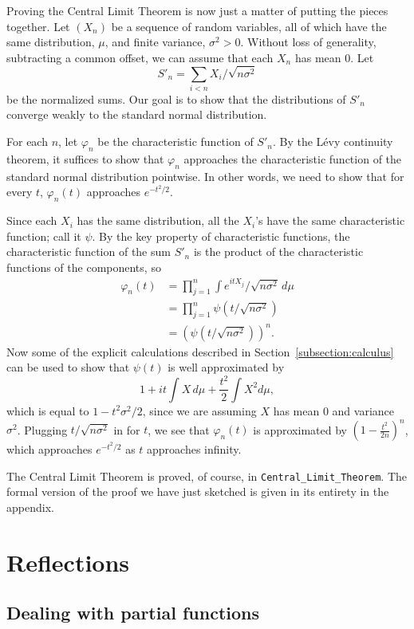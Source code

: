 \documentclass{svjour3}
\newcommand{\ph}{\varphi}
\begin{document}
Proving the Central Limit Theorem is now just a matter of putting the pieces together. Let $(X_n)$ be a sequence of random variables, all of which have the same distribution, $\mu$, and finite variance, $\sigma^2 > 0$. Without loss of generality, subtracting a common offset, we can assume that each $X_n$ has mean $0$. Let
\[
 S'_n = \sum_{i < n} X_i / \sqrt {n \sigma^2}
\]
be the normalized sums. Our goal is to show that the distributions of $S'_n$ converge weakly to the standard normal distribution. 

For each $n$, let $\ph_n$ be the characteristic function of $S'_n$. By the L\'evy continuity theorem, it suffices to show that $\ph_n$ approaches the characteristic function of the standard normal distribution pointwise. In other words, we need to show that for every $t$, $\ph_n(t)$ approaches $e^{-t^2/2}$.

Since each $X_i$ has the same distribution, all the $X_i$'s have the same characteristic function; call it $\psi$. By the key property of characteristic functions, the characteristic function of the sum $S'_n$ is the product of the characteristic functions of the components, so
\begin{align*}
 \ph_n(t) & = \prod_{j = 1}^n \int e^{itX_j} / \sqrt{n \sigma^2} \, d\mu \\
   & = \prod_{j = 1}^n \psi(t / \sqrt{n \sigma^2}) \\
   & = (\psi(t / \sqrt{n \sigma^2}))^n.
\end{align*}
Now some of the explicit calculations described in Section~\ref{subsection:calculus} can be used to show that $\psi(t)$ is well approximated by
\[
1 + it \int X \, d\mu + \frac{t^2}{2} \int X^2 d\mu, 
\]
which is equal to $1 - t^2\sigma^2 / 2$, since we are assuming $X$ has mean $0$ and variance $\sigma^2$. Plugging $t / \sqrt{n \sigma^2}$ in for $t$, we see that $\ph_n(t)$ is approximated by $(1 - \frac{t^2}{2n})^n$, which approaches $e^{-t^2/2}$ as $t$ approaches infinity.

The Central Limit Theorem is proved, of course, in \verb=Central_Limit_Theorem=. The formal version of the proof we have just sketched is given in its entirety in the appendix. 

\section{Reflections}
\label{section:reflections}

\subsection{Dealing with partial functions}
\label{subsection:partial}
\end{document}
